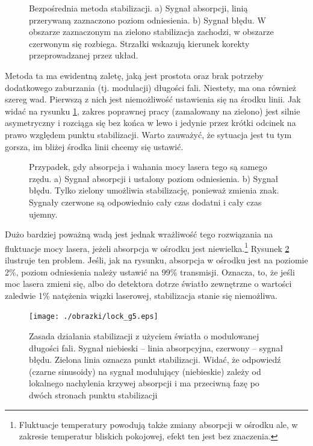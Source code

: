 \documentclass[a4paper,10pt,twoside]{report}
\begin{document}
\begin{figure}[h!]
\caption{Bezpośrednia metoda stabilizacji. a) Sygnał absorpcji, linią przerywaną zaznaczono poziom odniesienia. b) Sygnał błędu. W obszarze zaznaczonym na zielono stabilizacja zachodzi, w obszarze czerwonym się rozbiega. Strzałki wskazują kierunek korekty przeprowadzanej przez układ.}
\label{fig:lock1}
\end{figure} 

Metoda ta ma ewidentną zaletę, jaką jest prostota oraz brak potrzeby dodatkowego zaburzania (tj. modulacji) długości fali.
Niestety, ma ona również szereg wad. Pierwszą z nich jest niemożliwość ustawienia się na środku linii. Jak widać na
rysunku \ref{fig:lock1}, zakres poprawnej pracy (zamalowany na zielono) jest silnie asymetryczny i rozciąga się 
bez końca w lewo i jedynie przez krótki odcinek na prawo względem punktu stabilizacji. Warto zauważyć, że sytuacja jest tu tym gorsza, im
bliżej środka linii chcemy się ustawić.

\begin{figure}[h!]
\caption{Przypadek, gdy absorpcja i wahania mocy lasera tego są samego rzędu. a) Sygnał absorpcji i ustalony poziom odniesienia. b) Sygnał błędu. Tylko zielony umożliwia stabilizację, ponieważ zmienia znak. Sygnały czerwone są odpowiednio cały czas dodatni i cały czas ujemny. }
\label{fig:lock2}
\end{figure} 


Dużo bardziej poważną wadą jest jednak wrażliwość tego rozwiązania na fluktuacje mocy lasera, jeżeli absorpcja w ośrodku jest niewielka.\footnote{Fluktuacje temperatury powodują także zmiany absorpcji w ośrodku ale, w zakresie temperatur bliskich pokojowej, efekt ten jest bez znaczenia.} 
Rysunek \ref{fig:lock2} ilustruje ten problem. Jeśli, jak na rysunku, absorpcja w ośrodku jest na poziomie 2\%, poziom odniesienia
należy ustawić na 99\% transmisji. Oznacza, to, że jeśli moc lasera zmieni się, albo do detektora dotrze światło zewnętrzne o wartości
zaledwie 1\% natężenia wiązki laserowej, stabilizacja stanie się niemożliwa.

\begin{figure}

\texttt{[image: ./obrazki/lock\_g5.eps]}
\caption{Zasada działania stabilizacji z użyciem światła o modulowanej długości fali. Sygnał niebieski -- linia absorpcyjna, czerwony -- sygnał błędu. Zielona linia oznacza punkt stabilizacji. Widać, że odpowiedź (czarne sinusoidy) na sygnał modulujący (niebieskie) zależy od lokalnego nachylenia krzywej absorpcji i ma przeciwną fazę po dwóch stronach punktu stabilizacji}
\label{fig:lock3}
\end{figure} 
\end{document}
